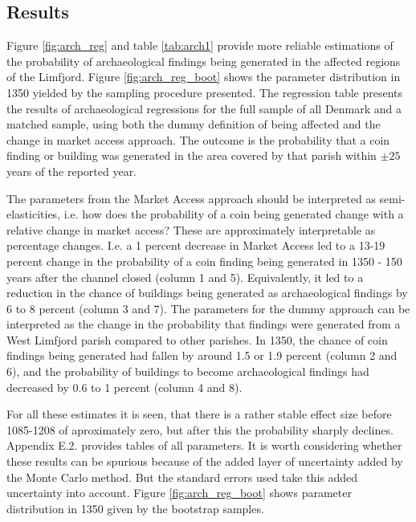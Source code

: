 \documentclass[11pt]{article}
\begin{document}
\FloatBarrier
\subsection{Results}

Figure \ref{fig:arch_reg} and table \ref{tab:arch1} provide more reliable estimations of the probability of archaeological findings being generated in the affected regions of the Limfjord. Figure \ref{fig:arch_reg_boot} shows the parameter distribution in 1350 yielded by the sampling procedure presented. The regression table presents the results of archaeological regressions for the full sample of all Denmark and a matched sample, using both the dummy definition of being affected and the change in market access approach. The outcome is the probability that a coin finding or building was generated in the area covered by that parish within $\pm 25$ years of the reported year. 

The parameters from the Market Access approach should be interpreted as semi-elasticities, i.e. how does the probability of a coin being generated change with a relative change in market access? These are approximately interpretable as percentage changes. I.e. a 1 percent decrease in Market Access led to a 13-19 percent change in the probability of a coin finding being generated in 1350 - 150 years after the channel closed (column 1 and 5). Equivalently, it led to a reduction in the chance of buildings being generated as archaeological findings by 6 to 8 percent (column 3 and 7). The parameters for the dummy approach can be interpreted as the change in the probability that findings were generated from a West Limfjord parish compared to other parishes. In 1350, the chance of coin findings being generated had fallen by around 1.5 or 1.9 percent  (column 2 and 6), and the probability of buildings to become archaeological findings had decreased by 0.6 to 1 percent (column 4 and 8). 

For all these estimates it is seen, that there is a rather stable effect size before 1085-1208 of aproximately zero, but after this the probability sharply declines. Appendix E.2. provides tables of all parameters. It is worth considering whether these results can be spurious because of the added layer of uncertainty added by the Monte Carlo method. But the standard errors used take this added uncertainty into account. Figure \ref{fig:arch_reg_boot} shows parameter distribution in 1350 given by the bootstrap samples.
\end{document}
